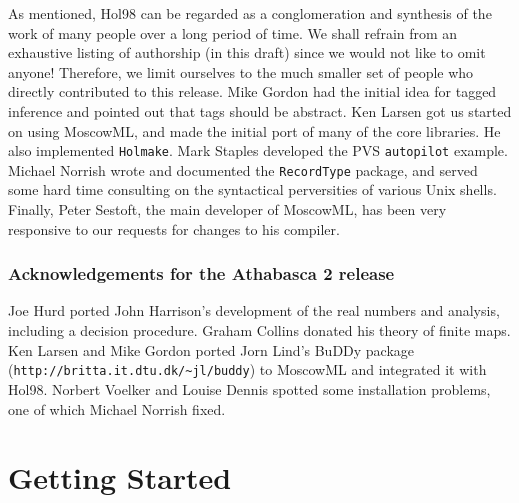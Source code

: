 \documentclass[12pt,fleqn,a4paper]{report}
\begin{document}
As mentioned, Hol98 can be regarded as a conglomeration and synthesis of
the work of many people over a long period of time. We shall refrain
from an exhaustive listing of authorship (in this draft) since we would
not like to omit anyone! Therefore, we limit ourselves to the much
smaller set of people who directly contributed to this release.  Mike
Gordon had the initial idea for tagged inference and pointed out that
tags should be abstract. Ken Larsen got us started on using MoscowML,
and made the initial port of many of the core libraries. He also
implemented \verb+Holmake+. Mark Staples developed the PVS
\verb+autopilot+ example. Michael Norrish wrote and documented the
\verb+RecordType+ package, and served some hard time consulting on the
syntactical perversities of various Unix shells. Finally, Peter Sestoft,
the main developer of MoscowML, has been very responsive to our requests
for changes to his compiler.

\subsection*{Acknowledgements for the Athabasca 2 release}

Joe Hurd ported John Harrison's development of the real numbers and
analysis, including a decision procedure. Graham Collins donated his
theory of finite maps. Ken Larsen and Mike Gordon ported Jorn Lind's
BuDDy package (\verb+http://britta.it.dtu.dk/~jl/buddy+) to MoscowML and
integrated it with Hol98. Norbert Voelker and Louise Dennis spotted some
installation problems, one of which Michael Norrish fixed.


\tableofcontents

\chapter{Getting Started}
\end{document}
